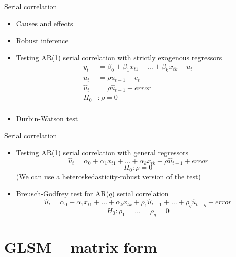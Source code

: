 \documentclass{beamer}
\begin{document}

\begin{frame}{Serial correlation}
\begin{itemize}
\item Causes and effects
\item Robust inference
\item Testing AR(1) serial correlation with strictly exogenous regressors
\begin{align}\nonumber
y_t & = \beta_0+\beta_1 x_{t1}+\dots+\beta_k x_{tk}+u_t \\ \nonumber
u_t & = \rho u_{t-1} + e_t \\ \nonumber
\hat{u}_t &= \rho \hat{u}_{t-1}+error \\ \nonumber
H_0 & : \rho=0\\\nonumber
\end{align}
\item Durbin-Watson test
\end{itemize}
\end{frame}


\begin{frame}{Serial correlation}
\begin{itemize}
\item Testing AR(1) serial correlation with general regressors
$$\hat{u}_t=\alpha_0+\alpha_1 x_{t1} + \dots + \alpha_k x_{tk} + \rho \hat{u}_{t-1} + \textit{error}$$
$$H_0 : \rho = 0$$
(We can use a heteroskedasticity-robust version of the test)

\vspace{0.5cm}

\item Breusch-Godfrey test for AR($q$) serial correlation
$$\hat{u}_t=\alpha_0+\alpha_1 x_{t1} + \dots + \alpha_k x_{tk} + \rho_1 \hat{u}_{t-1} +\dots+ \rho_q \hat{u}_{t-q}+\textit{error}  $$
$$H_0 : \rho_1 = \dots = \rho_q = 0$$
\end{itemize}
\end{frame}


\section{GLSM – matrix form}
\end{document}
